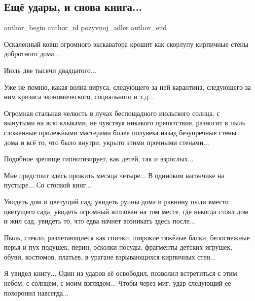  
 
 
 
 
 
\subsection{Ещё удары, и снова книга...}
\label{sec:28_09_2021.fb.pozyvnoj_adler.1.kniga_ekskavator}
 
\ifcmt
 author_begin
   author_id pozyvnoj_adler
 author_end
\fi

Оскаленный ковш огромного экскаватора крошит как скорлупу кирпичные стены
добротного дома...

Июль две тысячи двадцатого...

Уже не помню, какая волна вируса, следующего за ней карантина, следующего за
ним кризиса экономического, социального и т.д...

Огромная стальная челюсть в лучах беспощадного июльского солнца, с вынутыми на
всю клыками, не чувствуя никакого препятствия, разносит в пыль сложенные
прилежными мастерами более полувека назад безупречные стены дома и всё то, что
было внутри, укрыто этими прочными стенами...

Подобное зрелище гипнотизирует, как детей, так и взрослых...

Мне предстоит здесь прожить месяца четыре... В одиноком вагончике на пустыре...
Со стопкой книг... 

Увидеть дом и цветущий сад, увидеть руины дома и равнину пыли вместо цветущего
сада, увидеть огромный котлован на том месте, где некогда стоял дом и жил сад,
увидеть то, что едва начнёт возникать здесь после...

Пыль, стекло, разлетающиеся как спички, широкие тяжёлые балки, белоснежные
перья и пух подушек, перин, осколки посуды, фрагменты детских игрушек, обуви,
костюмов, платьев, в урагане взрывающихся кирпичных стен...

Я увидел книгу... Один из ударов её освободил, позволил встретиться с этим
небом, с солнцем, с моим взглядом... Чтобы через миг, удар следующий её
похоронил навсегда...


